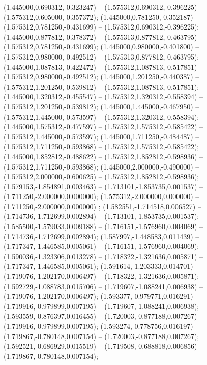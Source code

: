  (1.445000,0.690312,-0.323247) -- (1.575312,0.690312,-0.396225) -- (1.575312,0.605000,-0.357372);
 (1.445000,0.781250,-0.352187) -- (1.575312,0.781250,-0.431699) -- (1.575312,0.690312,-0.396225);
 (1.445000,0.877812,-0.378372) -- (1.575313,0.877812,-0.463795) -- (1.575312,0.781250,-0.431699);
 (1.445000,0.980000,-0.401800) -- (1.575312,0.980000,-0.492512) -- (1.575313,0.877812,-0.463795);
 (1.445000,1.087813,-0.422472) -- (1.575312,1.087813,-0.517851) -- (1.575312,0.980000,-0.492512);
 (1.445000,1.201250,-0.440387) -- (1.575312,1.201250,-0.539812) -- (1.575312,1.087813,-0.517851);
 (1.445000,1.320312,-0.455547) -- (1.575312,1.320312,-0.558394) -- (1.575312,1.201250,-0.539812);
 (1.445000,1.445000,-0.467950) -- (1.575312,1.445000,-0.573597) -- (1.575312,1.320312,-0.558394);
 (1.445000,1.575312,-0.477597) -- (1.575312,1.575312,-0.585422) -- (1.575312,1.445000,-0.573597);
 (1.445000,1.711250,-0.484487) -- (1.575312,1.711250,-0.593868) -- (1.575312,1.575312,-0.585422);
 (1.445000,1.852812,-0.488622) -- (1.575312,1.852812,-0.598936) -- (1.575312,1.711250,-0.593868);
 (1.445000,2.000000,-0.490000) -- (1.575312,2.000000,-0.600625) -- (1.575312,1.852812,-0.598936);
 (1.579153,-1.854891,0.003463) -- (1.713101,-1.853735,0.001537) -- (1.711250,-2.000000,0.000000);
 (1.575312,-2.000000,0.000000) -- (1.711250,-2.000000,0.000000) ;
 (1.582551,-1.714518,0.006527) -- (1.714736,-1.712699,0.002894) -- (1.713101,-1.853735,0.001537);
 (1.585500,-1.579033,0.009188) -- (1.716151,-1.576960,0.004069) -- (1.714736,-1.712699,0.002894);
 (1.587997,-1.448583,0.011439) -- (1.717347,-1.446585,0.005061) -- (1.716151,-1.576960,0.004069);
 (1.590036,-1.323306,0.013278) -- (1.718322,-1.321636,0.005871) -- (1.717347,-1.446585,0.005061);
 (1.591614,-1.203333,0.014701) -- (1.719076,-1.202170,0.006497) -- (1.718322,-1.321636,0.005871);
 (1.592729,-1.088783,0.015706) -- (1.719607,-1.088241,0.006938) -- (1.719076,-1.202170,0.006497);
 (1.593377,-0.979771,0.016291) -- (1.719916,-0.979899,0.007195) -- (1.719607,-1.088241,0.006938);
 (1.593559,-0.876397,0.016455) -- (1.720003,-0.877188,0.007267) -- (1.719916,-0.979899,0.007195);
 (1.593274,-0.778756,0.016197) -- (1.719867,-0.780148,0.007154) -- (1.720003,-0.877188,0.007267);
 (1.592521,-0.686929,0.015519) -- (1.719508,-0.688818,0.006856) -- (1.719867,-0.780148,0.007154);
